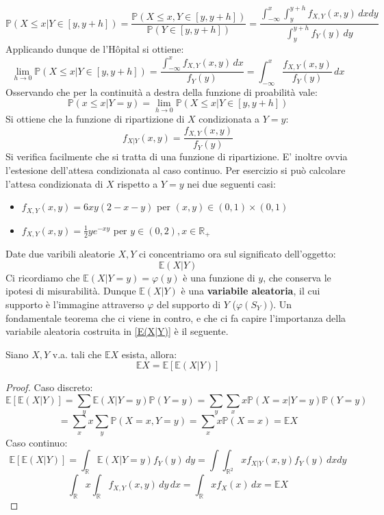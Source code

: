    \[\mathbb{P}(X\leq x|Y\in[y,y+h])=\frac{\mathbb{P}(X\leq x,Y\in[y,y+h])}{\mathbb{P}(Y\in[y,y+h])}=
    \frac{\int_{-\infty}^x\int_y^{y+h}f_{X,Y}(x,y) \, dxdy}{\int_y^{y+h}f_Y(y) \,dy}\]
Applicando dunque de l'Hôpital si ottiene:
    \[\lim_{h\to 0}\mathbb{P}(X\leq x|Y\in[y,y+h])=\frac{\int_{-\infty}^xf_{X,Y}(x,y) \,dx}{f_Y(y)}=\int_{-\infty}^x\frac{f_{X,Y}(x,y)}{f_Y(y)} \, dx\]
Osservando che per la continuità a destra della funzione di proabilità vale:
\[\mathbb{P}(x\leq x|Y=y)=\lim_{h\to0}\mathbb{P}(X\leq x|Y\in[y,y+h])\]
Si ottiene che la funzione di ripartizione di $X$ condizionata a $Y=y$:
\begin{equation}
    f_{X|Y}(x,y)=\frac{f_{X,Y}(x,y)}{f_Y(y)}
\end{equation}
Si verifica facilmente che si tratta di una funzione di ripartizione. E' inoltre ovvia l'estesione dell'attesa condizionata al caso continuo. Per esercizio si può calcolare l'attesa condizionata di $X$ rispetto a $Y=y$ nei due seguenti casi:
\begin{itemize}
    \item $f_{X,Y}(x,y)=6xy(2-x-y)$ per $(x,y)\in(0,1)\times(0,1)$
    \item $f_{X,Y}(x,y)=\frac{1}{2}ye^{-xy}$ per $y\in(0,2) , x\in\mathbb{R}_+$
\end{itemize}

Date due varibili aleatorie $X,Y$ ci concentriamo ora sul significato dell'oggetto:
\begin{equation} \label{E(X|Y)}
    \mathbb{E}(X|Y)
\end{equation}
Ci ricordiamo che $\mathbb{E}(X|Y=y)=\varphi(y)$ è una funzione di $y$, che conserva le ipotesi di misurabilità. Dunque $\mathbb{E}(X|Y)$ è una \textbf{variabile aleatoria}, il cui supporto è l'immagine attraverso $\varphi$ del supporto di $Y$ ($\varphi(S_Y)$). Un fondamentale teorema che ci viene in contro, e che ci fa capire l'importanza della variabile aleatoria costruita in \ref{E(X|Y)} è il seguente.

\newcommand{\E}{\mathbb{E}}
\newcommand{\V}{\mathbb{V}ar}

\begin{theorem}
Siano $X,Y$ v.a. tali che $\mathbb{E}X$ esista, allora:
\begin{equation}
    \mathbb{E}X=\mathbb{E}[\mathbb{E}(X|Y)]
\end{equation}
\begin{proof}
Caso discreto:
\[ \E[\E(X|Y)]=\sum_y \E(X|Y=y)\mathbb{P}(Y=y)=\sum_y\sum_x x\mathbb{P}(X=x|Y=y)\mathbb{P}(Y=y)\]
\[=\sum_x x\sum_y\mathbb{P}(X=x,Y=y)=\sum_x x\mathbb{P}(X=x)=\E X \]
Caso continuo:
\[ \E[\E(X|Y)]=\int_{\mathbb{R}}\E(X|Y=y)f_Y(y) \,dy=\int\int_{\mathbb{R}^2}x f_{X|Y}(x,y)f_Y(y) \,dxdy \]
\[\int_{\mathbb{R}}x \int_{\mathbb{R}}f_{X,Y}(x,y) \,dy \,dx=\int_{\mathbb{R}}x f_X(x) \,dx =\E X \]
\end{proof}
\end{theorem}

